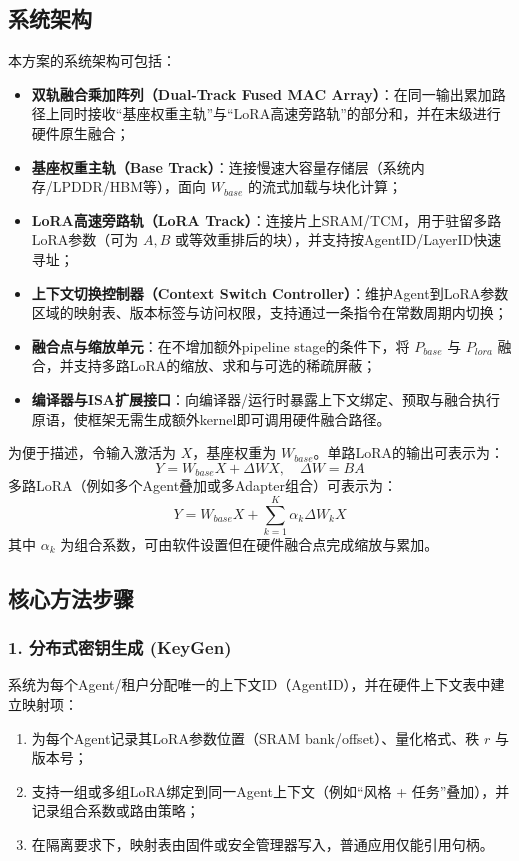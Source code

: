 \documentclass[12pt,a4paper]{article}
\begin{document}
\subsection{系统架构}

本方案的系统架构可包括：
\begin{itemize}
    \item \textbf{双轨融合乘加阵列（Dual-Track Fused MAC Array）}：在同一输出累加路径上同时接收“基座权重主轨”与“LoRA高速旁路轨”的部分和，并在末级进行硬件原生融合；
    \item \textbf{基座权重主轨（Base Track）}：连接慢速大容量存储层（系统内存/LPDDR/HBM等），面向 $W_{base}$ 的流式加载与块化计算；
    \item \textbf{LoRA高速旁路轨（LoRA Track）}：连接片上SRAM/TCM，用于驻留多路LoRA参数（可为 $A,B$ 或等效重排后的块），并支持按AgentID/LayerID快速寻址；
    \item \textbf{上下文切换控制器（Context Switch Controller）}：维护Agent到LoRA参数区域的映射表、版本标签与访问权限，支持通过一条指令在常数周期内切换；
    \item \textbf{融合点与缩放单元}：在不增加额外pipeline stage的条件下，将 $P_{base}$ 与 $P_{lora}$ 融合，并支持多路LoRA的缩放、求和与可选的稀疏屏蔽；
    \item \textbf{编译器与ISA扩展接口}：向编译器/运行时暴露上下文绑定、预取与融合执行原语，使框架无需生成额外kernel即可调用硬件融合路径。
\end{itemize}

为便于描述，令输入激活为 $X$，基座权重为 $W_{base}$。单路LoRA的输出可表示为：
\[
Y = W_{base}X + \Delta WX,\quad \Delta W = BA
\]
多路LoRA（例如多个Agent叠加或多Adapter组合）可表示为：
\[
Y = W_{base}X + \sum_{k=1}^{K} \alpha_k \Delta W_k X
\]
其中 $\alpha_k$ 为组合系数，可由软件设置但在硬件融合点完成缩放与累加。

\subsection{核心方法步骤}

\subsubsection{1. 分布式密钥生成 (KeyGen)}
系统为每个Agent/租户分配唯一的上下文ID（AgentID），并在硬件上下文表中建立映射项：
\begin{enumerate}
    \item 为每个Agent记录其LoRA参数位置（SRAM bank/offset）、量化格式、秩 $r$ 与版本号；
    \item 支持一组或多组LoRA绑定到同一Agent上下文（例如“风格 + 任务”叠加），并记录组合系数或路由策略；
    \item 在隔离要求下，映射表由固件或安全管理器写入，普通应用仅能引用句柄。
\end{enumerate}
\end{document}
